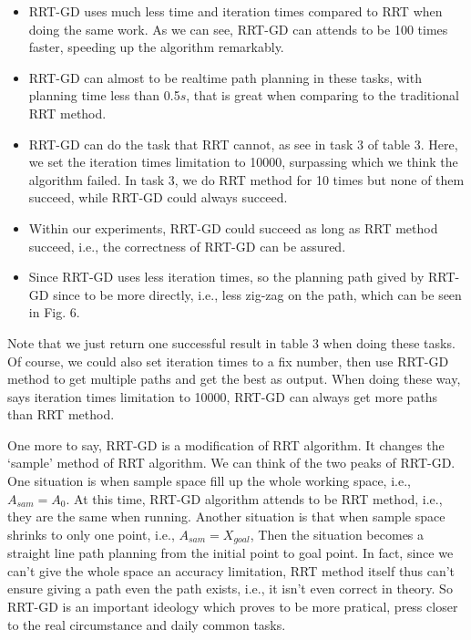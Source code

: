 \documentclass[letterpaper, 10 pt, conference]{ieeeconf}  %
\begin{document}
\begin{itemize}

\item RRT-GD uses much less time and iteration times compared to RRT when doing the same work. As we can see, RRT-GD can attends to be 100 times faster, speeding up the algorithm remarkably.
\item RRT-GD can almost to be realtime path planning in these tasks, with planning time less than 0.5$s$, that is great when comparing to the traditional RRT method.
\item RRT-GD can do the task that RRT cannot, as see in task 3 of table 3. Here, we set the iteration times limitation to 10000,  surpassing which we think the algorithm failed. In task 3, we do RRT method for 10 times but none of them succeed, while RRT-GD could always succeed.
\item Within our experiments, RRT-GD could succeed as long as RRT method succeed, i.e., the correctness of RRT-GD can be assured.
\item Since RRT-GD uses less iteration times, so the planning path gived by RRT-GD since to be more directly, i.e., less zig-zag on the path, which can be seen in Fig. 6.

\end{itemize}



Note that we just return one successful result in table 3 when doing these tasks. Of course, we could also set iteration times to a fix number, then use RRT-GD method to get multiple paths and get the best as output. When doing these way, says iteration times limitation to 10000, RRT-GD can always get more paths than RRT method.

One more to say, RRT-GD is a modification of RRT algorithm. It changes the `sample' method of RRT algorithm. We can think of the two peaks of RRT-GD. One situation is when sample space fill up the whole working space, i.e., $A_{sam} = A_{0}$. At this time, RRT-GD algorithm attends to be RRT method, i.e., they are the same when running. Another situation is that when sample space shrinks to only one point, i.e., $A_{sam} = {X_{goal}}$, Then the situation becomes a straight line path planning from the initial point to goal point. In fact, since we can't give the whole space an accuracy limitation, RRT method itself thus can't ensure giving a path even the path exists, i.e., it isn't even correct in theory. So RRT-GD is an important ideology which proves to be more pratical, press closer to the real circumstance and daily common tasks. 
\end{document}
